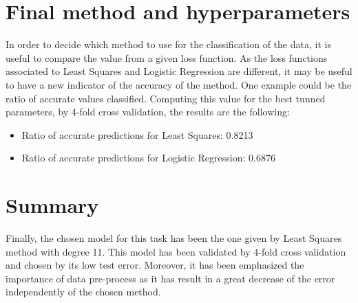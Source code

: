 \documentclass[10pt,conference]{IEEEtran}
\begin{document}
\section{Final method and hyperparameters}

In order to decide which method to use for the classification of the data, it is useful to compare the value from a given loss function. As the loss functions associated to Least Squares and Logistic Regression are different, it may be useful to have a new indicator of the accuracy of the method. One example could be the ratio of accurate values classified. Computing this value for the best tunned parameters, by 4-fold cross validation, the results are the following:

\begin{itemize}
\item{}Ratio of accurate predictions for Least Squares: 0.8213
\item{}Ratio of accurate predictions for Logistic Regression: 0.6876
\end{itemize}

\section{Summary}

Finally, the chosen model for this task has been the one given by Least Squares method with degree 11. This model has been validated by 4-fold cross validation and chosen by its low test error. 
Moreover, it has been emphasized the importance of data pre-process as it has result in a great decrease of the error independently of the chosen method. 
\end{document}
